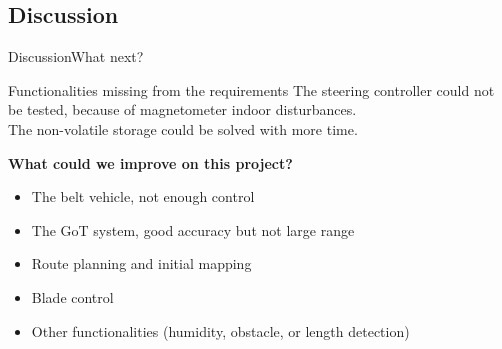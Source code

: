 


\subsection{Discussion}

\begin{frame}{Discussion}{What next?}

\pause

  \begin{block}{Functionalities missing from the requirements}
  	  The  steering controller could not be tested, because of magnetometer indoor disturbances.\\
      The non-volatile storage could be solved with more time.
  \end{block}
  
  \pause
  
  \textbf{What could we improve on this project?}
   \begin{itemize}
    \item<1-> The belt vehicle, not enough control
    \pause
    \item<2-> The GoT system, good accuracy but not large range
    \item<3-> Route planning and initial mapping
    \item<4-> Blade control
    \item<5-> Other functionalities (humidity, obstacle, or length detection) 
    \end{itemize}
\end{frame}






